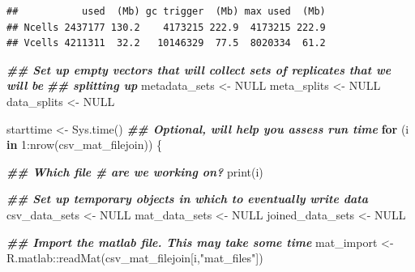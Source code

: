 \documentclass[
]{book}
\newenvironment{Shaded}{\begin{snugshade}}{\end{snugshade}}
\newcommand{\ConstantTok}[1]{\textcolor[rgb]{0.00,0.00,0.00}{#1}}
\newcommand{\ControlFlowTok}[1]{\textcolor[rgb]{0.13,0.29,0.53}{\textbf{#1}}}
\newcommand{\DecValTok}[1]{\textcolor[rgb]{0.00,0.00,0.81}{#1}}
\newcommand{\DocumentationTok}[1]{\textcolor[rgb]{0.56,0.35,0.01}{\textbf{\textit{#1}}}}
\newcommand{\FunctionTok}[1]{\textcolor[rgb]{0.00,0.00,0.00}{#1}}
\newcommand{\NormalTok}[1]{#1}
\newcommand{\OtherTok}[1]{\textcolor[rgb]{0.56,0.35,0.01}{#1}}
\newcommand{\SpecialCharTok}[1]{\textcolor[rgb]{0.00,0.00,0.00}{#1}}
\newcommand{\StringTok}[1]{\textcolor[rgb]{0.31,0.60,0.02}{#1}}
\begin{document}
\begin{verbatim}
##           used  (Mb) gc trigger  (Mb) max used  (Mb)
## Ncells 2437177 130.2    4173215 222.9  4173215 222.9
## Vcells 4211311  32.2   10146329  77.5  8020334  61.2
\end{verbatim}

\begin{Shaded}
\begin{Highlighting}[]
\DocumentationTok{\#\# Set up empty vectors that will collect sets of replicates that we will be}
\DocumentationTok{\#\# splitting up}
\NormalTok{metadata\_sets }\OtherTok{\textless{}{-}} \ConstantTok{NULL}
\NormalTok{meta\_splits }\OtherTok{\textless{}{-}} \ConstantTok{NULL}
\NormalTok{data\_splits }\OtherTok{\textless{}{-}} \ConstantTok{NULL}

\NormalTok{starttime }\OtherTok{\textless{}{-}} \FunctionTok{Sys.time}\NormalTok{() }\DocumentationTok{\#\# Optional, will help you assess run time}
\ControlFlowTok{for}\NormalTok{ (i }\ControlFlowTok{in} \DecValTok{1}\SpecialCharTok{:}\FunctionTok{nrow}\NormalTok{(csv\_mat\_filejoin)) \{}

  \DocumentationTok{\#\# Which file \# are we working on?}
  \FunctionTok{print}\NormalTok{(i)}

  \DocumentationTok{\#\# Set up temporary objects in which to eventually write data}
\NormalTok{  csv\_data\_sets }\OtherTok{\textless{}{-}} \ConstantTok{NULL}
\NormalTok{  mat\_data\_sets }\OtherTok{\textless{}{-}} \ConstantTok{NULL}
\NormalTok{  joined\_data\_sets }\OtherTok{\textless{}{-}} \ConstantTok{NULL}

  \DocumentationTok{\#\# Import the matlab file. This may take some time}
\NormalTok{  mat\_import }\OtherTok{\textless{}{-}}
\NormalTok{    R.matlab}\SpecialCharTok{::}\FunctionTok{readMat}\NormalTok{(csv\_mat\_filejoin[i,}\StringTok{"mat\_files"}\NormalTok{])}


\end{Highlighting}
\end{Shaded}
\end{document}
